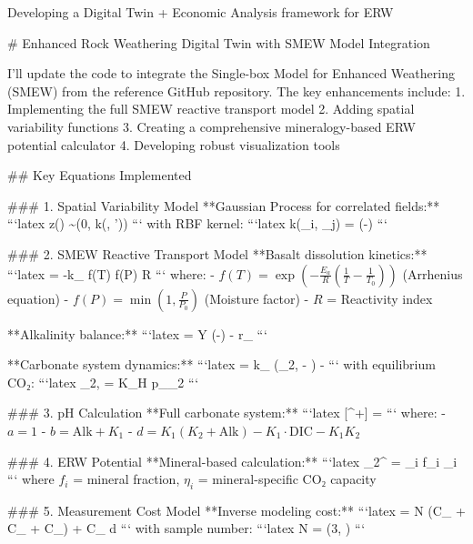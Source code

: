 Developing a Digital Twin + Economic Analysis framework for ERW 

# Enhanced Rock Weathering Digital Twin with SMEW Model Integration

I'll update the code to integrate the Single-box Model for Enhanced Weathering (SMEW) from the reference GitHub repository. The key enhancements include:
1. Implementing the full SMEW reactive transport model
2. Adding spatial variability functions
3. Creating a comprehensive mineralogy-based ERW potential calculator
4. Developing robust visualization tools


## Key Equations Implemented

### 1. Spatial Variability Model
**Gaussian Process for correlated fields:**
```latex
z() \sim {}(0, k(, '))
```
with RBF kernel:
```latex
k(_i, _j) = \exp\left(-\right)
```

### 2. SMEW Reactive Transport Model
**Basalt dissolution kinetics:**
```latex
 = -k_{} \cdot f(T) \cdot f(P) \cdot R
```
where:
- $f(T) = \exp\left(-\frac{E_a}{R}\left(\frac{1}{T} - \frac{1}{T_0}\right)\right)$ (Arrhenius equation)
- $f(P) = \min\left(1, \frac{P}{P_0}\right)$ (Moisture factor)
- $R$ = Reactivity index

**Alkalinity balance:**
```latex
 = Y \cdot \left(-\right) - \lambda \cdot r_{}
```

**Carbonate system dynamics:**
```latex
 = k_{} \cdot (_{2,} - ) -  
```
with equilibrium CO₂:
```latex
_{2,} = K_H \cdot p_{_2}
```

### 3. pH Calculation
**Full carbonate system:**
```latex
[^+] = 
```
where:
- $a = 1$
- $b = \text{Alk} + K_1$
- $d = K_1(K_2 + \text{Alk}) - K_1 \cdot \text{DIC} - K_1K_2$

### 4. ERW Potential
**Mineral-based calculation:**
```latex
_2^{} = \sum_i f_i \cdot \eta_i
```
where $f_i$ = mineral fraction, $\eta_i$ = mineral-specific CO₂ capacity

### 5. Measurement Cost Model
**Inverse modeling cost:**
```latex
 = N \cdot (C_{} + C_{} + C_{}) + C_{} \cdot d
```
with sample number:
```latex
N = \max\left(3, \right)
```

